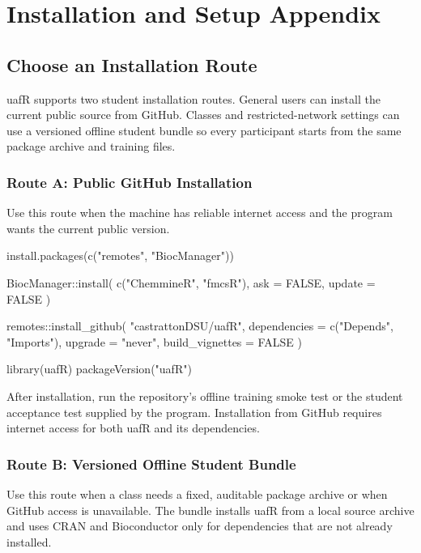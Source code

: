 \chapter{Installation and Setup Appendix}

\section{Choose an Installation Route}
uafR supports two student installation routes. General users can install the
current public source from GitHub. Classes and restricted-network settings can
use a versioned offline student bundle so every participant starts from the
same package archive and training files.

\subsection{Route A: Public GitHub Installation}
Use this route when the machine has reliable internet access and the program
wants the current public version.

\begin{rcode}
install.packages(c("remotes", "BiocManager"))

BiocManager::install(
  c("ChemmineR", "fmcsR"),
  ask = FALSE,
  update = FALSE
)

remotes::install_github(
  "castrattonDSU/uafR",
  dependencies = c("Depends", "Imports"),
  upgrade = "never",
  build_vignettes = FALSE
)

library(uafR)
packageVersion("uafR")
\end{rcode}

After installation, run the repository's offline training smoke test or the
student acceptance test supplied by the program. Installation from GitHub
requires internet access for both uafR and its dependencies.

\subsection{Route B: Versioned Offline Student Bundle}
Use this route when a class needs a fixed, auditable package archive or when
GitHub access is unavailable. The bundle installs uafR from a local source
archive and uses CRAN and Bioconductor only for dependencies that are not
already installed.

